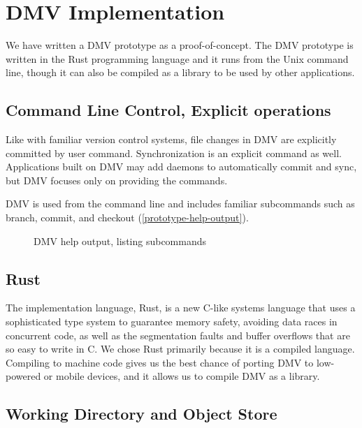 \chapter{DMV Implementation}

We have written a DMV prototype as a proof-of-concept. The DMV prototype is
written in the Rust programming language and it runs from the Unix command line,
though it can also be compiled as a library to be used by other applications.


\section{Command Line Control, Explicit operations}

Like with familiar version control systems, file changes in DMV are explicitly
committed by user command. Synchronization is an explicit command as well.
Applications built on DMV may add daemons to automatically commit and sync, but
DMV focuses only on providing the commands.

DMV is used from the command line and includes familiar subcommands such as
branch, commit, and checkout (\autoref{prototype-help-output}).

\begin{figure}[h]
    \caption{DMV help output, listing subcommands}
    \label{prototype-help-output}
    
\end{figure}



\section{Rust}

The implementation language, Rust, is a new C-like systems language that uses a
sophisticated type system to guarantee memory safety,
avoiding data races in concurrent code, as well as the segmentation faults and
buffer overflows that are so easy to write in C. We chose Rust primarily because
it is a compiled language. Compiling to machine code gives us the best chance of
porting DMV to low-powered or mobile devices, and it allows us to compile DMV as
a library.



\section{Working Directory and Object Store}\label{dir-impl}

